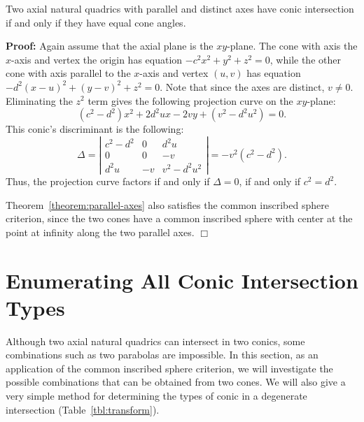 \begin{theorem}
\label{theorem:parallel-axes}
     Two axial natural quadrics with parallel and distinct axes have conic
intersection if and only if they have equal cone angles.
\end{theorem}
{\bf Proof:}
Again assume that the axial plane is the $xy$-plane.
The cone with axis
the $x$-axis and vertex the origin has equation $-c^2x^2+y^2+z^2=0$,
while the other cone with axis parallel to the $x$-axis and vertex $(u,v)$
has equation $-d^2(x-u)^2+(y-v)^2+z^2=0$.  Note that since
the axes are distinct,
$v\neq 0$.  Eliminating the $z^2$ term gives the following
projection curve on the $xy$-plane:
\[ (c^2-d^2)x^2+2d^2ux-2vy+(v^2-d^2u^2)=0. \]
This conic's discriminant is the following:
\[ \Delta=\left| \begin{array}{ccc}
                    c^2-d^2 & 0 & d^2u \\
                        0   & 0 & -v   \\
                       d^2u & -v & v^2-d^2u^2
                 \end{array} \right| = -v^2(c^2-d^2). \]
Thus, the projection curve factors if and only if $\Delta=0$, if and only if
$c^2=d^2$. \QED

\begin{remark} \rm
Theorem~\ref{theorem:parallel-axes} also satisfies the
common inscribed sphere criterion, since
the two cones have a common inscribed sphere with center at the point at
infinity along the two parallel axes. $\Box$
\end{remark}


%

\section{Enumerating All Conic Intersection Types}
\label{section:enumeration}

     Although two axial natural quadrics can intersect in two conics, some
combinations such as two parabolas are impossible.  In this
section, as an application of the common inscribed sphere criterion,
we will investigate the possible combinations that can be
obtained from two cones.
We will also give a very simple method for determining the types of conic
in a degenerate intersection (Table~\ref{tbl:transform}).

